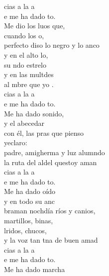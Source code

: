 \begin{cancion}%
	cias a la a \\
	e me ha dado to.\\
	Me dio los luos que, \\
	cuando los o,\\
	perfecto diso lo negro y lo anco\\
	y en el alto lo, \\
	su ndo estrelo\\
	y en las multdes\\
	al mbre que yo .\\
	cias a la a \\
	e me ha dado to.\\
	Me ha dado sonido, \\
	y el abecedar \\
	con él, las pras que pienso \\
	yeclaro:\\
	padre, amigherma y luz alumndo\\
	la ruta del aldel questoy aman \\
	cias a la a \\
	e me ha dado to.\\
	Me ha dado oído\\
	y en todo su anc \\
	braman nochdía ríos y canios,\\
	martillos, binas, \\
	lridos, chucos,\\
	y la voz tan tna de  buen amad \\
	cias a la a \\
	e me ha dado to.\\
	Me ha dado marcha \\

\end{cancion}
